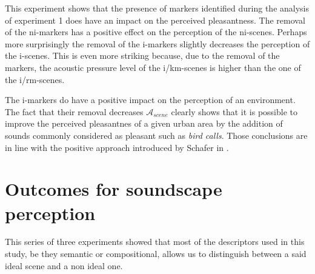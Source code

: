\documentclass[twoside,twocolumn]{article}
\begin{document}
This experiment shows that the presence of markers identified during the analysis of experiment 1 does have an impact on the perceived pleasantness. The removal of the ni-markers has a positive effect on the perception of the ni-scenes. Perhaps more surprisingly the removal of the i-markers slightly decreases the perception of the i-scenes. This is even more striking because, due to the removal of the markers, the acoustic pressure level of the i/km-scenes is higher than the one of the i/rm-scenes.


The i-markers do have a positive impact on the perception of an environment. The fact that their removal decreases $\mathcal{A}_{scene}$ clearly shows that it is possible to improve the perceived pleasantnes of a given urban area by the addition of sounds commonly considered as pleasant such as \emph{bird calls}. Those conclusions are in line with the positive approach introduced by Schafer in \cite{schafer1977tuning}.



\section{Outcomes for soundscape perception}
\label{sec:conclusion}

This series of three experiments showed that most of the descriptors used in this study, be they semantic or compositional, allows us to distinguish between a said ideal scene and a non ideal one.

\end{document}

